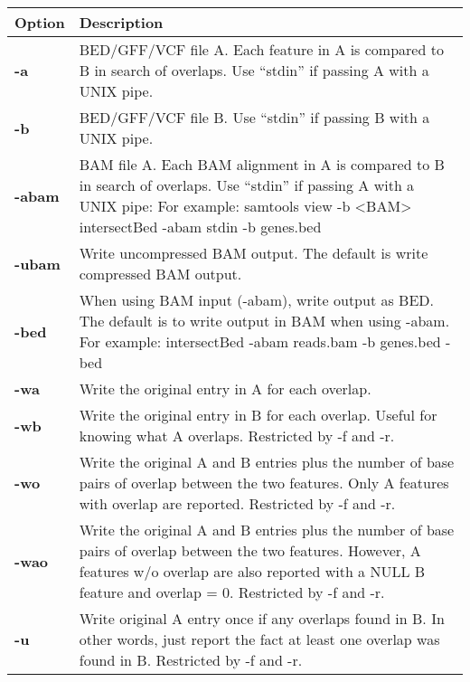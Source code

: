 \documentclass[letterpaper,10pt,english]{sphinxmanual}
\begin{document}
\begin{tabulary}{\linewidth}{|L|L|}
\hline
\textbf{
Option
} & \textbf{
Description
}\\\hline

\textbf{-a}
 & 
BED/GFF/VCF file A. Each feature in A is compared to B in search of overlaps. Use ``stdin'' if passing A with a UNIX pipe.
\\\hline

\textbf{-b}
 & 
BED/GFF/VCF file B. Use ``stdin'' if passing B with a UNIX pipe.
\\\hline

\textbf{-abam}
 & 
BAM file A. Each BAM alignment in A is compared to B in search of overlaps. Use ``stdin'' if passing A with a UNIX pipe: For example: samtools view -b \textless{}BAM\textgreater{} \textbar{} intersectBed -abam stdin -b genes.bed
\\\hline

\textbf{-ubam}
 & 
Write uncompressed BAM output. The default is write compressed BAM output.
\\\hline

\textbf{-bed}
 & 
When using BAM input (-abam), write output as BED. The default is to write output in BAM when using -abam. For example:   intersectBed -abam reads.bam -b genes.bed -bed
\\\hline

\textbf{-wa}
 & 
Write the original entry in A for each overlap.
\\\hline

\textbf{-wb}
 & 
Write the original entry in B for each overlap. Useful for knowing what A overlaps. Restricted by -f and -r.
\\\hline

\textbf{-wo}
 & 
Write the original A and B entries plus the number of base pairs of overlap between the two features. Only A features with overlap are reported. Restricted by -f and -r.
\\\hline

\textbf{-wao}
 & 
Write the original A and B entries plus the number of base pairs of overlap between the two features. However, A features w/o overlap are also reported with a NULL B feature and overlap = 0. Restricted by -f and -r.
\\\hline

\textbf{-u}
 & 
Write original A entry once if any overlaps found in B. In other words, just report the fact at least one overlap was found in B. Restricted by -f and -r.
\\\hline


\end{tabulary}
\end{document}

